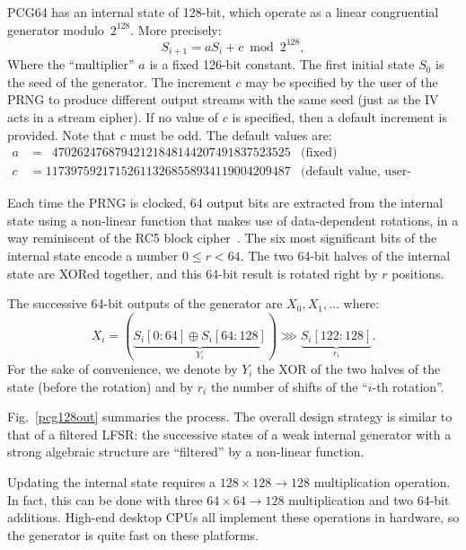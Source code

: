 \documentclass[submission,svgnames,journal=tosc]{iacrtrans}
\begin{document}
\textsf{PCG64} has an internal state of 128-bit, which operate as a linear
congruential generator modulo~$2^{128}$. More precisely:
\[
  S_{i+1} = a S_i + c \bmod 2^{128},
\]
Where the ``multiplier'' $a$ is a fixed 126-bit constant. The first initial state $S_0$ is the seed of
the generator. The increment $c$ may be specified by the user of the PRNG to
produce different output streams with the same seed (just as the IV acts in a
stream cipher). If no value of $c$ is specified, then a default increment is
provided. Note that $c$ must be odd. The default values are:
\begin{align*}
  a &= \phantom{1}47026247687942121848144207491837523525 & \text{(fixed)}\\
  c &= 117397592171526113268558934119004209487           & \text{(default value, user-definable)}
\end{align*}

Each time the PRNG is clocked, 64 output bits are extracted from the internal
state using a non-linear function that makes use of data-dependent rotations, in
a way reminiscent of the \textsf{RC5} block cipher~\cite{Rivest94}. The six most
significant bits of the internal state encode a number $0 \leq r < 64$. The two
64-bit halves of the internal state are XORed together, and this 64-bit result
is rotated right by $r$ positions.

The successive 64-bit outputs of the generator are $X_0, X_1, \dots$ where:
\begin{equation}\label{eq:output}
  X_i =(\underbrace{S_i[0:64] \oplus S_i[64:128]}_{Y_i}) \ggg \underbrace{S_i[122:128]}_{r_i}.
\end{equation}
For the sake of convenience, we denote by $Y_i$ the XOR of the two halves of the
state (before the rotation) and by $r_i$ the number of shifts of the ``$i$-th
rotation''.

Fig.~\ref{pcg128out} summaries the process. The overall design strategy is
similar to that of a filtered LFSR: the successive states of a weak internal
generator with a strong algebraic structure are ``filtered'' by a non-linear
function.

Updating the internal state requires a $128 \times 128 \rightarrow 128$
multiplication operation. In fact, this can be done with three
$64 \times 64 \rightarrow 128$ multiplication and two 64-bit additions. High-end
desktop CPUs all implement these operations in hardware, so the generator is
quite fast on these platforms.
\end{document}
